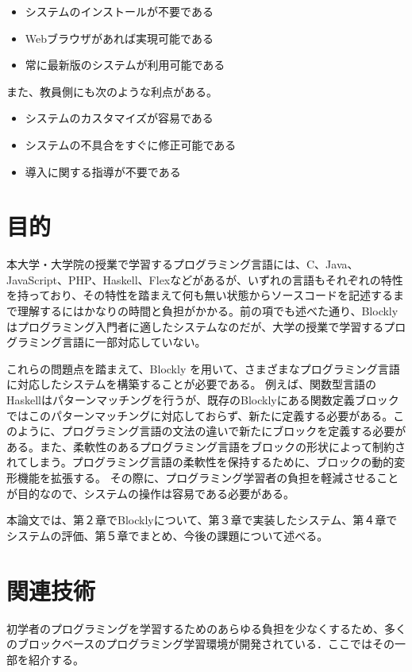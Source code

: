 \documentclass{risepaper}
\begin{document}
\begin{itemize}
\item システムのインストールが不要である
\item Webブラウザがあれば実現可能である
\item 常に最新版のシステムが利用可能である
\end{itemize} 

また、教員側にも次のような利点がある。

\begin{itemize}
\item システムのカスタマイズが容易である
\item システムの不具合をすぐに修正可能である
\item 導入に関する指導が不要である
\end{itemize} 
 
     \section{目的}

本大学・大学院の授業で学習するプログラミング言語には、C、Java、JavaScript、PHP、Haskell、Flexなどがあるが、いずれの言語もそれぞれの特性を持っており、その特性を踏まえて何も無い状態からソースコードを記述するまで理解するにはかなりの時間と負担がかかる。前の項でも述べた通り、Blocklyはプログラミング入門者に適したシステムなのだが、大学の授業で学習するプログラミング言語に一部対応していない。

これらの問題点を踏まえて、Blockly を用いて、さまざまなプログラミング言語に対応したシステムを構築することが必要である。
例えば、関数型言語のHaskellはパターンマッチングを行うが、既存のBlocklyにある関数定義ブロックではこのパターンマッチングに対応しておらず、新たに定義する必要がある。このように、プログラミング言語の文法の違いで新たにブロックを定義する必要がある。また、柔軟性のあるプログラミング言語をブロックの形状によって制約されてしまう。プログラミング言語の柔軟性を保持するために、ブロックの動的変形機能を拡張する。
その際に、プログラミング学習者の負担を軽減させることが目的なので、システムの操作は容易である必要がある。

本論文では、第２章でBlocklyについて、第３章で実装したシステム、第４章でシステムの評価、第５章でまとめ、今後の課題について述べる。
 	
 	\section{関連技術}
    
初学者のプログラミングを学習するためのあらゆる負担を少なくするため、多くのブロックベースのプログラミング学習環境が開発されている．ここではその一部を紹介する。
\end{document}
